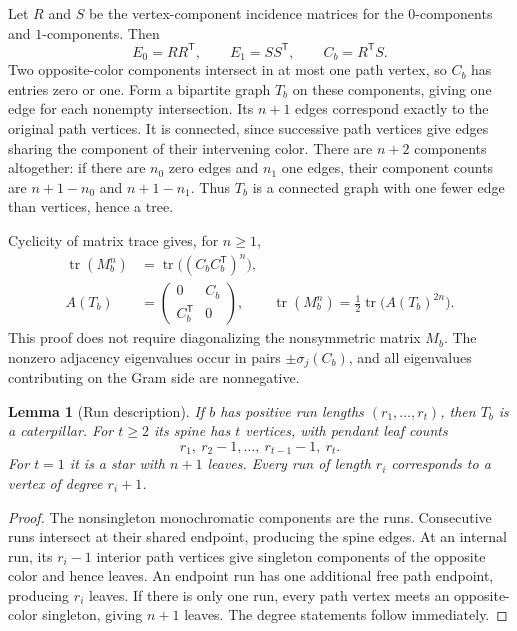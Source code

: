 \documentclass[11pt,letterpaper]{article}
\numberwithin{equation}{section}
\newtheorem{lemma}[theorem]{Lemma}
\theoremstyle{remark}\newtheorem{remark}[theorem]{Remark}
\DeclareMathOperator{\tr}{tr}\DeclareMathOperator{\TV}{TV}
\begin{document}
Let $R$ and $S$ be the vertex-component incidence matrices for the $0$-components and $1$-components. Then
\[
E_0=RR^\mathsf T,\qquad E_1=SS^\mathsf T,\qquad C_b=R^\mathsf TS.
\]
Two opposite-color components intersect in at most one path vertex, so $C_b$ has entries zero or one. Form a bipartite graph $T_b$ on these components, giving one edge for each nonempty intersection. Its $n+1$ edges correspond exactly to the original path vertices. It is connected, since successive path vertices give edges sharing the component of their intervening color. There are $n+2$ components altogether: if there are $n_0$ zero edges and $n_1$ one edges, their component counts are $n+1-n_0$ and $n+1-n_1$. Thus $T_b$ is a connected graph with one fewer edge than vertices, hence a tree.

Cyclicity of matrix trace gives, for $n\ge1$,
\begin{align}
\tr(M_b^n)&=\tr\bigl((C_bC_b^\mathsf T)^n\bigr),\label{mdk:sq:eq:gram}\\
A(T_b)&=\begin{pmatrix}0&C_b\\C_b^\mathsf T&0\end{pmatrix},\qquad
\tr(M_b^n)=\frac12\tr\bigl(A(T_b)^{2n}\bigr).\label{mdk:sq:eq:tree-trace}
\end{align}
This proof does not require diagonalizing the nonsymmetric matrix $M_b$. The nonzero adjacency eigenvalues occur in pairs $\pm\sigma_j(C_b)$, and all eigenvalues contributing on the Gram side are nonnegative.

\begin{lemma}[Run description]\label{mdk:sq:lem:caterpillar}
If $b$ has positive run lengths $(r_1,\ldots,r_t)$, then $T_b$ is a caterpillar. For $t\ge2$ its spine has $t$ vertices, with pendant leaf counts
\[
r_1,\ r_2-1,\ldots,\ r_{t-1}-1,\ r_t.
\]
For $t=1$ it is a star with $n+1$ leaves. Every run of length $r_i$ corresponds to a vertex of degree $r_i+1$.
\end{lemma}
\begin{proof}
The nonsingleton monochromatic components are the runs. Consecutive runs intersect at their shared endpoint, producing the spine edges. At an internal run, its $r_i-1$ interior path vertices give singleton components of the opposite color and hence leaves. An endpoint run has one additional free path endpoint, producing $r_i$ leaves. If there is only one run, every path vertex meets an opposite-color singleton, giving $n+1$ leaves. The degree statements follow immediately.
\end{proof}
\end{document}
